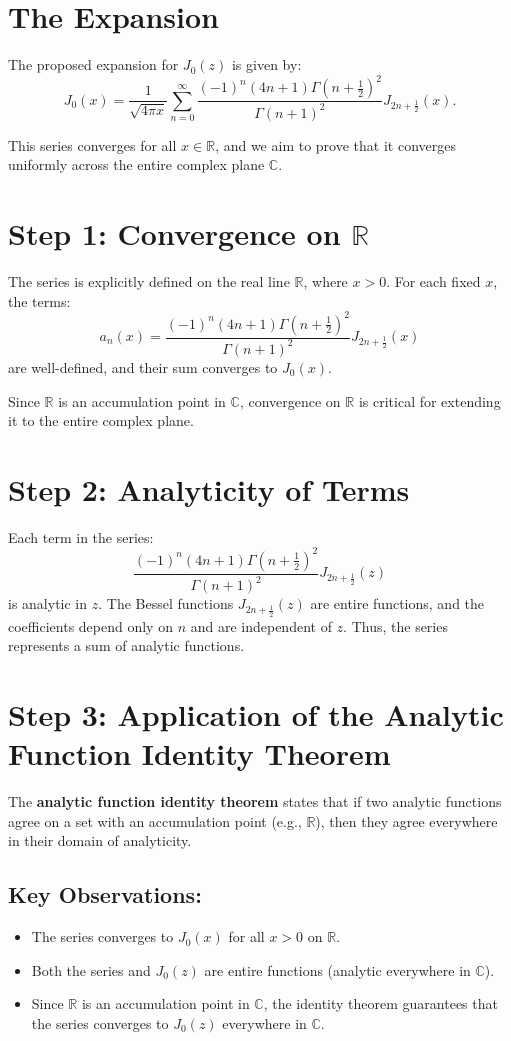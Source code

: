 \documentclass{article}
\begin{document}
\section*{The Expansion}

The proposed expansion for $J_0(z)$ is given by:
$$J_0(x) = \frac{1}{\sqrt{4\pi x}} \sum_{n=0}^\infty \frac{(-1)^n (4n + 1) \Gamma(n + \frac{1}{2})^2}{\Gamma(n + 1)^2} J_{2n + \frac{1}{2}}(x).$$

This series converges for all $x \in \mathbb{R}$, and we aim to prove that it converges uniformly across the entire complex plane $\mathbb{C}$.

\section*{Step 1: Convergence on $\mathbb{R}$}

The series is explicitly defined on the real line $\mathbb{R}$, where $x > 0$. For each fixed $x$, the terms:
$$a_n(x) = \frac{(-1)^n (4n + 1) \Gamma(n + \frac{1}{2})^2}{\Gamma(n + 1)^2} J_{2n + \frac{1}{2}}(x)$$
are well-defined, and their sum converges to $J_0(x)$.

Since $\mathbb{R}$ is an accumulation point in $\mathbb{C}$, convergence on $\mathbb{R}$ is critical for extending it to the entire complex plane.

\section*{Step 2: Analyticity of Terms}

Each term in the series:
$$\frac{(-1)^n (4n + 1) \Gamma(n + \frac{1}{2})^2}{\Gamma(n + 1)^2} J_{2n + \frac{1}{2}}(z)$$
is analytic in $z$. The Bessel functions $J_{2n + \frac{1}{2}}(z)$ are entire functions, and the coefficients depend only on $n$ and are independent of $z$. Thus, the series represents a sum of analytic functions.

\section*{Step 3: Application of the Analytic Function Identity Theorem}

The \textbf{analytic function identity theorem} states that if two analytic functions agree on a set with an accumulation point (e.g., $\mathbb{R}$), then they agree everywhere in their domain of analyticity.  

\subsection*{Key Observations:}
\begin{itemize}
    \item The series converges to $J_0(x)$ for all $x > 0$ on $\mathbb{R}$.
    \item Both the series and $J_0(z)$ are entire functions (analytic everywhere in $\mathbb{C}$).
    \item Since $\mathbb{R}$ is an accumulation point in $\mathbb{C}$, the identity theorem guarantees that the series converges to $J_0(z)$ everywhere in $\mathbb{C}$.
\end{itemize}
\end{document}
